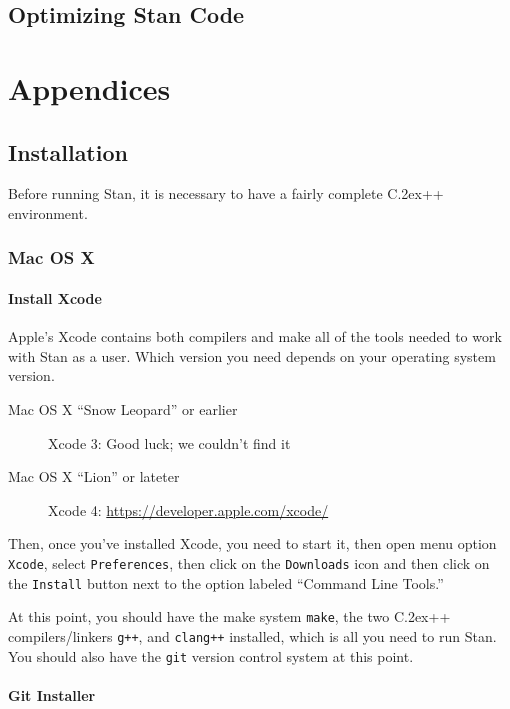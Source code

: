 \documentclass[10pt]{report}
\newcommand{\Stan}{Stan\xspace}
\newcommand*{\Cpp}{C\raise.2ex\hbox{\footnotesize ++}\xspace} %
\newcommand{\code}[1]{{\tt #1}}
\begin{document}
\chapter{Optimizing \Stan Code}\label{optimization.chapter}


\appendix

\part*{Appendices}


\chapter{Installation}\label{install.appendix}

Before running \Stan, it is necessary to have a fairly complete \Cpp
environment.

\section{Mac OS X}

\subsection{Install Xcode}

Apple's Xcode contains both compilers and make all of the tools needed 
to work with \Stan as a user.  Which version you need depends on your
operating system version.

\begin{description}
\item[Mac OS X ``Snow Leopard'' or earlier]
Xcode 3: Good luck; we couldn't find it
\item[Mac OS X ``Lion'' or lateter]
Xcode 4: \url{https://developer.apple.com/xcode/}
\end{description}

Then, once you've installed Xcode, you need to start it, then open
menu option \code{Xcode}, select \code{Preferences}, then click on the
\code{Downloads} icon and then click on the \code{Install} button next
to the option labeled ``Command Line Tools.''

At this point, you should have the make system \code{make}, the two
\Cpp compilers/linkers \code{g++}, and \code{clang++} installed, which
is all you need to run \Stan.  You should also have the \code{git}
version control system at this point.


\subsection{Git Installer}
\end{document}
